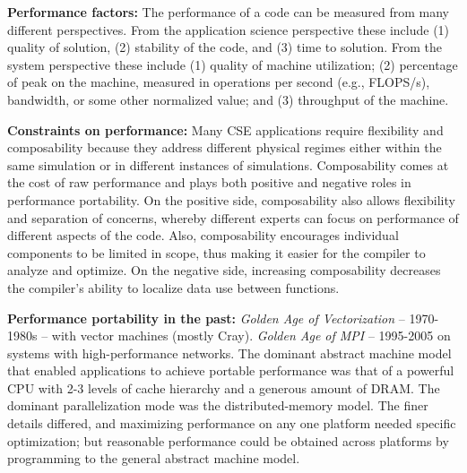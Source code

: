 \documentclass[]{article}
\begin{document}
\textbf{Performance factors:} The performance of a code can be
measured from many different perspectives. From the application science
perspective these include (1) quality of solution, (2) stability of the
code, and (3) time to solution. From the system perspective these
include (1) quality of machine utilization; (2) percentage of peak on
the machine, measured in operations per second (e.g., FLOPS/s),
bandwidth, or some other normalized value; and (3) throughput of the
machine.


\textbf{Constraints on performance:} Many CSE applications require
flexibility and composability because they address different physical
regimes either within the same simulation or in different instances of
simulations. Composability comes at the cost of raw performance and
plays both positive and negative roles in performance portability. On
the positive side, composability also allows flexibility and separation
of concerns, whereby different experts can focus on performance of
different aspects of the code. Also, composability encourages individual
components to be limited in scope, thus making it easier for the
compiler to analyze and optimize. On the negative side, increasing
composability decreases the compiler's ability to localize data use
between functions.

\textbf{Performance portability in the past:} \emph{Golden Age of
Vectorization} -- 1970-1980s -- with vector machines (mostly Cray).
\emph{Golden Age of MPI} -- 1995-2005 on systems with high-performance
networks. The dominant abstract machine model that enabled applications
to achieve portable performance was that of a powerful CPU with 2-3
levels of cache hierarchy and a generous amount of DRAM. The dominant
parallelization mode was the distributed-memory model. The finer details
differed, and maximizing performance on any one platform needed specific
optimization; but reasonable performance could be obtained across
platforms by programming to the general abstract machine model.
\end{document}

